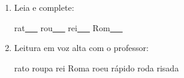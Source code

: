 \begin{exercicio}
\begin{enumerate}[resume]
\begin{enumerate}[label=(\alph*)]
    \item O som da unidade é: ( ) oral ( ) nasal ( ) vibrante

    \item A primeira sílaba de RATO é: ( ) RA ( ) RO

    \item As palavras da unidade aparecem: ( ) no início ( ) no meio ( ) no fim das palavras

  \end{enumerate}

  \item Leia e complete:
  \begin{center}
  rat\underline{~~~} \quad rou\underline{~~~} \quad rei\underline{~~~} \quad Rom\underline{~~~}
  \end{center}

  \item Leitura em voz alta com o professor:
  \begin{center}
  rato \quad roupa \quad rei \quad Roma \quad roeu \quad rápido \quad roda \quad risada
  \end{center}

\end{enumerate}

\end{exercicio}



